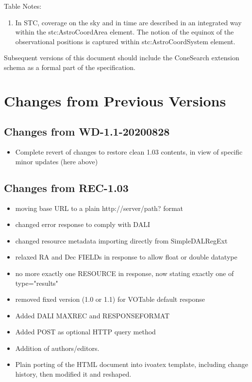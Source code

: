 \documentclass[11pt,a4paper]{ivoa}
\begin{document}
Table Notes:
\begin{enumerate}
	\item In STC, coverage on the sky and in time are described in an integrated way within the stc:AstroCoordArea element. The notion of the equinox of the observational positions is captured within stc:AstroCoordSystem element.
\end{enumerate}
Subsequent versions of this document should include the ConeSearch extension schema as a formal part of the specification.

\section{Changes from Previous Versions}

\subsection{Changes from WD-1.1-20200828}
\begin{itemize}
	\item Complete revert of changes to restore clean 1.03 contents, in view of specific minor updates (here above)
\end{itemize}

\subsection{Changes from REC-1.03}
\label{appendix:first11changes}
\begin{itemize}
	\item moving base URL to a plain http://server/path? format
	\item changed error response to comply with DALI
	\item changed resource metadata importing directly from SimpleDALRegExt
	\item relaxed RA and Dec FIELDs in response to allow float or double datatype
	\item no more exactly one RESOURCE in response, now stating exactly one of type="results"
	\item removed fixed version (1.0 or 1.1) for VOTable default response
	\item Added DALI MAXREC and RESPONSEFORMAT
	\item Added POST as optional HTTP query method
	\item Addition of authors/editors.
	\item Plain porting of the HTML document into ivoatex template,
including change history, then modified it and reshaped.
\end{itemize}
\end{document}
